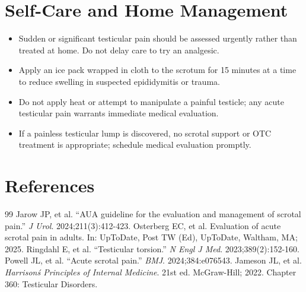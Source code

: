\section*{Self-Care and Home Management}
\begin{itemize}
  \item Sudden or significant testicular pain should be assessed urgently rather than treated at home. Do not delay care to try an analgesic.
  \item Apply an ice pack wrapped in cloth to the scrotum for 15 minutes at a time to reduce swelling in suspected epididymitis or trauma.
  \item Do not apply heat or attempt to manipulate a painful testicle; any acute testicular pain warrants immediate medical evaluation.
  \item If a painless testicular lump is discovered, no scrotal support or OTC treatment is appropriate; schedule medical evaluation promptly.
\end{itemize}

\section*{References}
\begin{thebibliography}{99}
 Jarow JP, et al. ``AUA guideline for the evaluation and management of scrotal pain.'' \emph{J Urol}. 2024;211(3):412-423.
 Osterberg EC, et al. Evaluation of acute scrotal pain in adults. In: UpToDate, Post TW (Ed), UpToDate, Waltham, MA; 2025.
 Ringdahl E, et al. ``Testicular torsion.'' \emph{N Engl J Med}. 2023;389(2):152-160.
 Powell JL, et al. ``Acute scrotal pain.'' \emph{BMJ}. 2024;384:e076543.
 Jameson JL, et al. \emph{Harrison\'s Principles of Internal Medicine}. 21st ed. McGraw-Hill; 2022. Chapter 360: Testicular Disorders.
\end{thebibliography}
